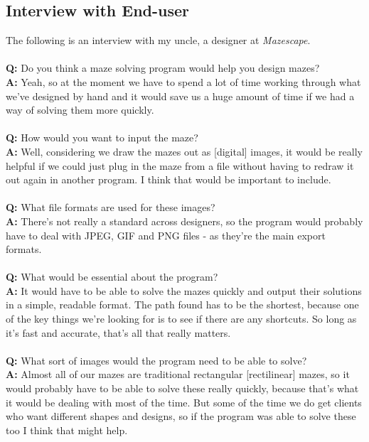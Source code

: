 \documentclass[titlepage]{article}
\begin{document}
\subsection{Interview with End-user}
The following is an interview with my uncle, a designer at \textit{Mazescape}.
\\\\
\textbf{Q:} Do you think a maze solving program would help you design mazes?
\\
\textbf{A:} Yeah, so at the moment we have to spend a lot of time working through what we've designed by hand and it would save us a huge amount of time if we had a way of solving them more quickly.
\\\\
\textbf{Q:} How would you want to input the maze?
\\
\textbf{A:} Well, considering we draw the mazes out as [digital] images, it would be really helpful if we could just plug in the maze from a file without having to redraw it out again in another program. I think that would be important to include.
\\\\
\textbf{Q:} What file formats are used for these images?
\\
\textbf{A:} There's not really a standard across designers, so the program would probably have to deal with JPEG, GIF and PNG files - as they're the main export formats. 
\\\\
\textbf{Q:} What would be essential about the program?
\\
\textbf{A:} It would have to be able to solve the mazes quickly and output their solutions in a simple, readable format. The path found has to be the shortest, because one of the key things we're looking for is to see if there are any shortcuts. So long as it's fast and accurate, that's all that really matters.
\\\\
\textbf{Q:} What sort of images would the program need to be able to solve?
\\
\textbf{A:} Almost all of our mazes are traditional rectangular [rectilinear] mazes, so it would probably have to be able to solve these really quickly, because that's what it would be dealing with most of the time. But some of the time we do get clients who want different shapes and designs, so if the program was able to solve these too I think that might help. 
\\\\
\end{document}
